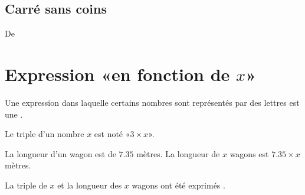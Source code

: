 
\subsection*{Carré sans coins}


De \cite{NRHooXFvgpp5}

\section{Expression «en fonction de \( x\)» }

\begin{definition}
    Une expression dans laquelle certains nombres sont représentés par des lettres est une .
\end{definition}

\begin{example}
    Le triple d'un nombre \( x\) est noté «\( 3\times x\)».
\end{example}

\begin{example}
    La longueur d'un wagon est de \( 7.35\) mètres. La longueur de \( x\) wagons est \( 7.35\times x\) mètres.
\end{example}

La triple de \( x\) et la longueur des \( x\) wagons ont été exprimés .

